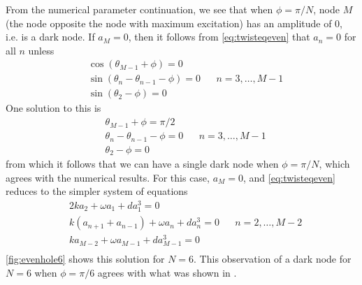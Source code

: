 \documentclass[12pt]{article}
\begin{document}
From the numerical parameter continuation, we see that when $\phi = \pi/N$, node $M$ (the node opposite the node with maximum excitation) has an amplitude of 0, i.e. is a dark node. If $a_M = 0$, then it follows from \cref{eq:twisteqeven} that $a_n = 0$ for all $n$ unless
\begin{equation}\label{eq:evendarknodecond}
\begin{aligned}
&\cos(\theta_{M-1} + \phi) = 0 \\
&\sin(\theta_{n} - \theta_{n-1} - \phi) = 0 && n = 3, \dots, M-1 \\
&\sin(\theta_2 - \phi) = 0
\end{aligned}
\end{equation}
One solution to this is
\begin{equation}\label{eq:evendarknodecond1}
\begin{aligned}
&\theta_{M-1} + \phi = \pi/2 \\
&\theta_{n} - \theta_{n-1} - \phi = 0 && n = 3, \dots, M-1 \\
&\theta_2 - \phi = 0
\end{aligned}
\end{equation}
from which it follows that we can have a single dark node when $\phi = \pi/N$, which agrees with the numerical results. For this case, $a_M = 0$, and \cref{eq:twisteqeven} reduces to the simpler system of equations
\begin{equation}\label{eq:twisteqevenhole}
\begin{aligned}
&2 k a_2 + \omega a_1 + d a_1^3 = 0 \\
&k\left( a_{n+1} + a_{n-1} \right) + \omega a_n + d a_n^3 = 0 && n = 2, \dots, M-2 \\
&k a_{M-2} + \omega a_{M-1} + d a_{M-1}^3 = 0 \\
\end{aligned}
\end{equation}
\cref{fig:evenhole6} shows this solution for $N=6$. This observation of a dark node for $N = 6$ when $\phi = \pi/6$ agrees with what was shown in \cite{castro2016}.
\end{document}
